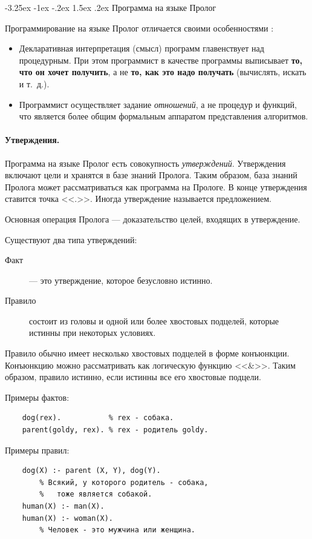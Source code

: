 \documentclass[12pt, openany, twoside]{book} %
\makeatletter
\renewcommand\section{\@startsection {section}{1}{\z@}%
                                   {-3.25ex \@plus -1ex \@minus -.2ex}%
                                   {1.5ex \@plus.2ex}%
                                   {\normalfont\large\bfseries}}
\makeatother
\begin{document}
\section{Программа на языке Пролог}

Программирование на языке Пролог отличается своими особенностями \cite{Bratko}:
\begin{itemize}
\item Декларативная интерпретация (смысл) программ главенствует над процедурным. При этом  программист в качестве программы выписывает {\bf то, что он хочет получить}, а не  {\bf то, как это надо получать} (вычислять, искать и т.~д.).
\item Программист осуществляет задание \emph{отношений}, а не {процедур и функций}, что является более общим формальным аппаратом представления алгоритмов.
\end{itemize}

\paragraph{Утверждения.} Программа на языке Пролог есть совокупность \emph{ут\-вер\-жде\-ний}. Утверждения включают цели и хранятся в базе знаний Пролога. Таким образом, база знаний Пролога может рассматриваться как программа на Прологе. В конце утверждения ставится точка <<.>>. Иногда утверждение называется предложением.

Основная операция Пролога --- доказательство целей, входящих в утверждение.

Существуют два типа утверждений:
\begin{description}
\item[Факт] --- это утверждение, которое безусловно истинно.
\item[Правило] состоит из головы и одной или более хвостовых подцелей, которые истинны при некоторых условиях.
\end{description}

Правило обычно имеет несколько хвостовых подцелей в форме конъюнкции. Конъюнкцию можно рассматривать как логическую функцию <<\&>>. Таким образом, правило истинно, если истинны все его хвостовые подцели.

Примеры фактов:
{\tt\begin{verbatim}
    dog(rex).           % rex - собака.
    parent(goldy, rex). % rex - родитель goldy.
\end{verbatim}}

Примеры правил:
{\tt\begin{verbatim}
    dog(X) :- parent (X, Y), dog(Y).
        % Всякий, у которого родитель - собака,
        %   тоже является собакой.
    human(Х) :- man(Х).
    human(Х) :- woman(Х).
        % Человек - это мужчина или женщина.
\end{verbatim}}
\end{document}
